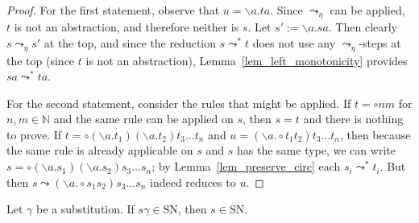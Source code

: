 \documentclass[runningheads,a4paper]{llncs}
\newcommand{\arreta}{\leadsto_\eta}
\newcommand{\arrnormalise}{\leadsto}
\newcommand{\abstraction}[2]{\backslash #1.#2}
\newcommand{\SN}{\mathrm{SN}}
\begin{document}
\begin{proof}
For the first statement, observe that $u = \abstraction{a}{t a}$.
Since $\arreta$ can be applied, $t$ is not an abstraction, and therefore
neither is $s$.  Let $s' := \abstraction{a}{s a}$.  Then clearly $s
\arreta s'$ at the top, and since the reduction $s \arrnormalise^* t$
does not use any $\arreta$-steps at the top (since $t$ is not an
abstraction), Lemma~\ref{lem_left_monotonicity} provides $s a
\arrnormalise^* t a$.

For the second statement, consider the rules that might be applied.
If $t = \circ n m$ for $n,m \in \mathbb{N}$ and the same rule can be
applied on $s$, then $s = t$ and there is nothing to prove.
If $t = \circ (\abstraction{a}{t_1}) (\abstraction{a}{t_2}) t_3 \ldots
t_n$ and $u = (\abstraction{a}{\circ t_1 t_2}) t_3 \ldots t_n$, then
because the same rule is already applicable on $s$ and $s$ has the
same type, we can write $s = \circ (\abstraction{a}{s_1})
(\abstraction{a}{s_2}) s_3 \ldots s_n$; by
Lemma~\ref{lem_preserve_circ} each $s_i \arrnormalise^* t_i$.  But then
$s \arrnormalise (\abstraction{a}{\circ s_1 s_2}) s_3 \ldots s_n$
indeed reduces to $u$.
\end{proof}

\begin{lemma}\label{lem_substitute_sn}
Let $\gamma$ be a substitution. If $s\gamma \in \SN$, then $s \in \SN$.
\end{lemma}
\end{document}
